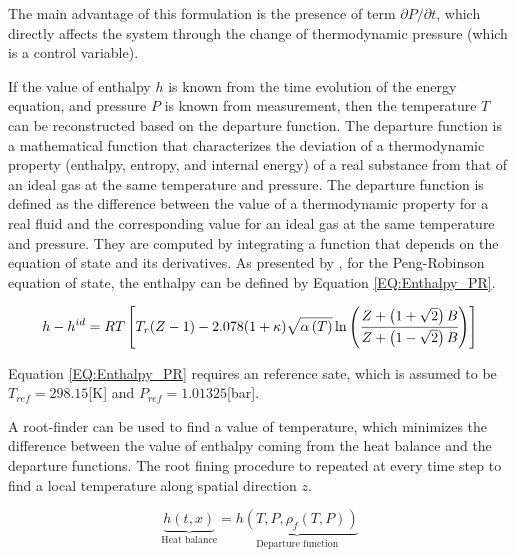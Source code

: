 \documentclass[../Article_Model_Parameters.tex]{subfiles}
\begin{document}
			The main advantage of this formulation is the presence of term $\partial P / \partial t $, which directly affects the system through the change of thermodynamic pressure (which is a control variable). %
			
			If the value of enthalpy $h$ is known from the time evolution of the energy equation, and pressure $P$ is known from measurement, then the temperature $T$ can be reconstructed based on the departure function. The departure function is a mathematical function that characterizes the deviation of a thermodynamic property (enthalpy, entropy, and internal energy) of a real substance from that of an ideal gas at the same temperature and pressure. The departure function is defined as the difference between the value of a thermodynamic property for a real fluid and the corresponding value for an ideal gas at the same temperature and pressure. They are computed by integrating a function that depends on the equation of state and its derivatives. As presented by \citet{Gmehling2019}, for the Peng-Robinson equation of state, the enthalpy can be defined by Equation \ref{EQ:Enthalpy_PR}.
			
			{\scriptsize
				\begin{equation}
					{\color{black}h}-{\color{black}h}^{id}={\color{black}R}T \left[{\color{black}T_r}({\color{black}Z}-1) -2.078(1+{\color{black}\kappa} ){\sqrt { {\color{black}\alpha}\left(T\right) } } \ln \left(\cfrac{{\color{black}Z}+\left( 1+\sqrt{2} \right){\color{black}B}}{{\color{black}Z}+\left( 1-\sqrt{2} \right){\color{black}B}}\right)\right]
					\label{EQ:Enthalpy_PR}
				\end{equation}				
			}
			
			Equation \ref{EQ:Enthalpy_PR} requires an reference sate, which is assumed to be $T_{ref}=298.15$[K] and $P_{ref}=1.01325$[bar].
			
			A root-finder can be used to find a value of temperature, which minimizes the difference between the value of enthalpy coming from the heat balance and the departure functions. The root fining procedure to repeated at every time step to find a local temperature along spatial direction $z$.
			
			{\footnotesize
				\begin{equation}
					\underbrace{h\left(t,x\right)}_{\text{Heat balance}}=\underbrace{h\left(T,P,\rho_f\left(T,P\right)\right)}_{\text{Departure function}}
					\label{EQ:Enthalpy_root}
				\end{equation}
			}
			
\end{document}
